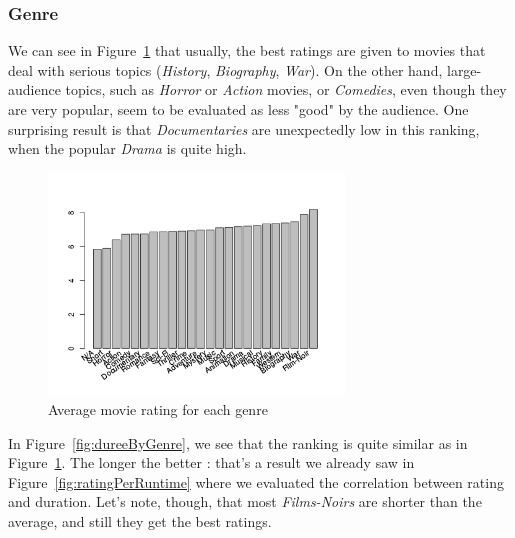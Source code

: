 \newpage
\subsubsection{Genre}
\label{subs:Genre}

We can see in Figure~\ref{fig:rateByGenre} that usually, the best ratings are given to movies that deal with serious topics (\textit{History}, \textit{Biography}, \textit{War}).
On the other hand, large-audience topics, such as \textit{Horror} or \textit{Action} movies, or \textit{Comedies}, even though they are very popular, seem to be evaluated as less "good" by the audience.
One surprising result is that \textit{Documentaries} are unexpectedly low in this ranking, when the popular \textit{Drama} is quite high.

\begin{figure}[!h]
\begin{center}
\includegraphics[width=0.70\textwidth]{../src/pre-processing/stats/results/rateByGenre.png}
\end{center}
\caption{Average movie rating for each genre}
\label{fig:rateByGenre}
\end{figure}

In Figure~\ref{fig:dureeByGenre}, we see that the ranking is quite similar as in Figure~\ref{fig:rateByGenre}.
The longer the better : that's a result we already saw in Figure~\ref{fig:ratingPerRuntime} where we evaluated the correlation between rating and duration.
Let's note, though, that most \textit{Films-Noirs} are shorter than the average, and still they get the best ratings.

